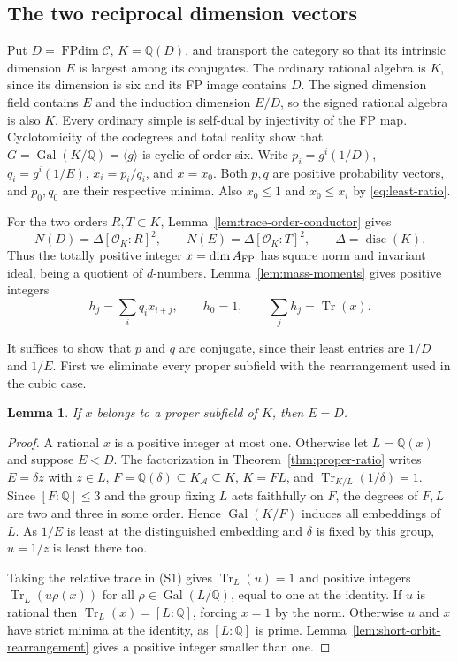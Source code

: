 \documentclass[11pt,reqno]{amsart}
\newtheorem{lemma}[theorem]{Lemma}
\theoremstyle{remark}\newtheorem{remark}[theorem]{Remark}
\numberwithin{equation}{section}
\begin{document}
\subsection{The two reciprocal dimension vectors}

Put $D=\operatorname{FPdim}\mathcal C$, $K=\mathbb Q(D)$, and
transport the category so that its intrinsic dimension $E$ is largest among
its conjugates. The ordinary rational algebra is $K$, since its
dimension is six and its FP image contains $D$. The signed dimension
field contains $E$ and the induction dimension $E/D$, so the signed
rational algebra is also $K$. Every ordinary simple is self-dual by
injectivity of the FP map. Cyclotomicity of the codegrees and total
reality show that $G=\operatorname{Gal}(K/\mathbb Q)=\langle g\rangle$
is cyclic of order six. Write $p_i=g^i(1/D)$, $q_i=g^i(1/E)$,
$x_i=p_i/q_i$, and $x=x_0$. Both $p,q$ are positive probability
vectors, and $p_0,q_0$ are their respective minima. Also $x_0\le1$
and $x_0\le x_i$ by \eqref{eq:least-ratio}.

For the two orders $R,T\subset K$, Lemma~\ref{lem:trace-order-conductor}
gives
\[
 N(D)=\Delta[\mathcal O_K:R]^2,\qquad
 N(E)=\Delta[\mathcal O_K:T]^2,\qquad \Delta=\operatorname{disc}(K).
\]
Thus the totally positive integer $x=\dim A_{\rm FP}$ has square
norm and invariant ideal, being a quotient of $d$-numbers.
Lemma~\ref{lem:mass-moments} gives positive integers
\[
 h_j=\sum_iq_i x_{i+j},\qquad h_0=1,\qquad
 \sum_j h_j=\operatorname{Tr}(x).
 \tag{S1}
\]

It suffices to show that $p$ and $q$ are conjugate, since their least
entries are $1/D$ and $1/E$. First we eliminate every proper subfield
with the rearrangement used in the cubic case.

\begin{lemma}\label{lem:sextic-proper-ratio}
If $x$ belongs to a proper subfield of $K$, then $E=D$.
\end{lemma}
\begin{proof}
A rational $x$ is a positive integer at most one. Otherwise let
$L=\mathbb Q(x)$ and suppose $E<D$. The factorization in
Theorem~\ref{thm:proper-ratio} writes $E=\delta z$ with
$z\in L$, $F=\mathbb Q(\delta)\subseteq K_{\mathcal A}\subseteq K$,
$K=FL$, and $\operatorname{Tr}_{K/L}(1/\delta)=1$. Since
$[F:\mathbb Q]\le3$ and the group fixing $L$ acts faithfully on $F$,
the degrees of $F,L$ are two and three in some order. Hence
$\operatorname{Gal}(K/F)$ induces all embeddings of $L$. As
$1/E$ is least at the distinguished embedding and $\delta$ is fixed
by this group, $u=1/z$ is least there too.

Taking the relative trace in (S1) gives $\operatorname{Tr}_L(u)=1$
and positive integers $\operatorname{Tr}_L(u\rho(x))$ for all
$\rho\in\operatorname{Gal}(L/\mathbb Q)$, equal to one at the identity.
If $u$ is rational then $\operatorname{Tr}_L(x)=[L:\mathbb Q]$,
forcing $x=1$ by the norm. Otherwise $u$ and $x$ have strict minima
at the identity, as $[L:\mathbb Q]$ is prime. Lemma~\ref{lem:short-orbit-rearrangement}
gives a positive integer smaller than one.
\end{proof}
\end{document}
